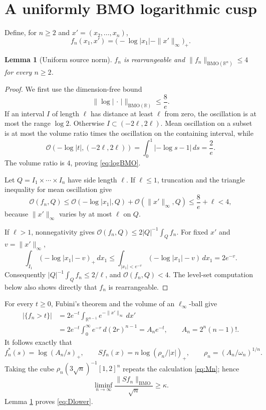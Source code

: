 \documentclass[11pt]{article}
\newtheorem{lemma}[theorem]{Lemma}
\newcommand{\R}{\mathbb R}
\newcommand{\BMO}{\mathrm{BMO}}
\newcommand{\osc}{\mathcal O}
\newcommand{\1}{\mathbf 1}
\begin{document}
\section{A uniformly BMO logarithmic cusp}

Define, for $n\ge2$ and $x'=(x_2,\ldots,x_n)$,
\begin{equation}\label{eq:cusp}
 f_n(x_1,x')=\bigl(-\log|x_1|-\|x'\|_\infty\bigr)_+.
\end{equation}

\begin{lemma}[Uniform source norm]\label{lem:cuspBMO}
$f_n$ is rearrangeable and
$\|f_n\|_{\BMO(\R^n)}\le4$ for every $n\ge2$.
\end{lemma}

\begin{proof}
We first use the dimension-free bound
\begin{equation}\label{eq:logBMO}
 \|\log|\,\cdot\,|\|_{\BMO(\R)}\le\frac8e.
\end{equation}
If an interval $I$ of length $\ell$ has distance at least $\ell$ from zero,
the oscillation is at most the range $\log2$.  Otherwise
$I\subset(-2\ell,2\ell)$.  Mean oscillation on a subset is at most the
volume ratio times the oscillation on the containing interval, while
\[
 \osc(-\log|t|,(-2\ell,2\ell))
 =\int_0^1|-\log s-1|\,ds=\frac2e.
\]
The volume ratio is $4$, proving \eqref{eq:logBMO}.

Let $Q=I_1\times\cdots\times I_n$ have side length $\ell$.  If
$\ell\le1$, truncation and the triangle inequality for mean oscillation
give
\[
 \osc(f_n,Q)
 \le \osc(-\log|x_1|,Q)+\osc(\|x'\|_\infty,Q)
 \le \frac8e+\ell<4,
\]
because $\|x'\|_\infty$ varies by at most $\ell$ on $Q$.

If $\ell>1$, nonnegativity gives
$\osc(f_n,Q)\le2|Q|^{-1}\int_Q f_n$.  For fixed $x'$ and
$v=\|x'\|_\infty$,
\[
 \int_{I_1}(-\log|x_1|-v)_+\,dx_1
 \le\int_{|x_1|<e^{-v}}(-\log|x_1|-v)\,dx_1
 =2e^{-v}.
\]
Consequently $|Q|^{-1}\int_Q f_n\le2/\ell$, and
$\osc(f_n,Q)<4$.  The level-set computation below also shows directly that
$f_n$ is rearrangeable.
\end{proof}

For every $t\ge0$, Fubini's theorem and the volume of an
$\ell_\infty$-ball give
\begin{align*}
 |\{f_n>t\}|
 &=2e^{-t}\int_{\R^{n-1}}e^{-\|x'\|_\infty}\,dx'\\
 &=2e^{-t}\int_0^\infty e^{-r}\,d(2r)^{n-1}
 =A_ne^{-t},
 \qquad A_n=2^n(n-1)!.
\end{align*}
It follows exactly that
\[
 f_n^*(s)=\log(A_n/s)_+,
 \qquad
 Sf_n(x)=n\log(\rho_n/|x|)_+,
 \qquad
 \rho_n=(A_n/\omega_n)^{1/n}.
\]
Taking the cube $\rho_n(3\sqrt n)^{-1}[1,2]^n$ repeats the calculation
\eqref{eq:Mn}; hence
\[
 \liminf_{n\to\infty}
 \frac{\|Sf_n\|_{\BMO}}{\sqrt n}\ge\kappa.
\]
Lemma \ref{lem:cuspBMO} proves \eqref{eq:Dlower}.
\end{document}
